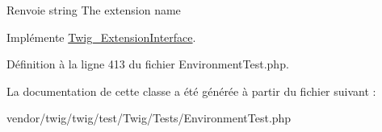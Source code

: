 \begin{DoxyReturn}{Renvoie}
string The extension name 
\end{DoxyReturn}


Implémente \hyperlink{interface_twig___extension_interface_a3d0963e68bb313b163a73f2803c64600}{Twig\+\_\+\+Extension\+Interface}.



Définition à la ligne 413 du fichier Environment\+Test.\+php.



La documentation de cette classe a été générée à partir du fichier suivant \+:\begin{DoxyCompactItemize}
\item 
vendor/twig/twig/test/\+Twig/\+Tests/Environment\+Test.\+php\end{DoxyCompactItemize}

